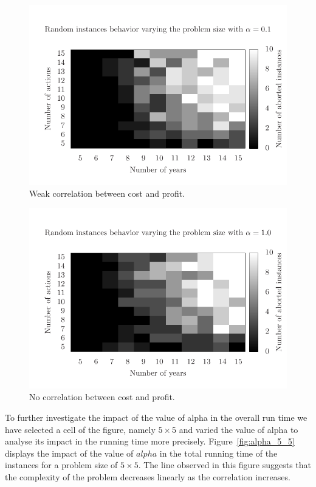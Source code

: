 \begin{figure}
\centering
\includegraphics[scale=0.73, trim=1cm 0 0 0]{figs/hard.pdf}
\caption{Weak correlation between cost and profit.}
\label{fig:time2}
\end{figure}

\begin{figure}
\centering
\includegraphics[scale=0.73 ,trim=1cm 0 0 0]{figs/easy.pdf}
\caption{No correlation between cost and profit.}
\label{fig:time3}
\end{figure}

To further investigate the impact of the value of alpha in the overall run time we have selected a cell of the
figure, namely $5\times5$ and varied the value of alpha to analyse its impact in the running time more precisely.
Figure~\ref{fig:alpha_5_5} displays the impact of the value of $alpha$ in the total running time of the instances for a
problem size of $5\times5$. The line observed in this figure suggests that the complexity of the problem 
decreases linearly as the correlation increases.

